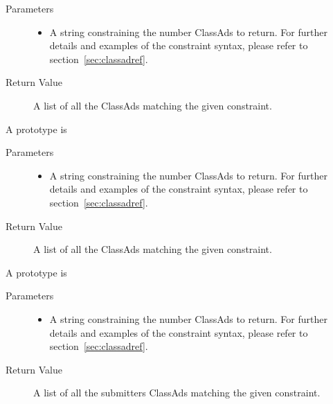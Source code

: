 \begin{description}

  \begin{description}
    \item[ Parameters]
    \begin{itemize}
      \item {} 
      A string constraining the number ClassAds to return. For further details 
      and examples of the constraint syntax, please refer to 
      section~\ref{sec:classadref}.
    \end{itemize}
    \item[ Return Value]
      A list of all the  ClassAds matching the given 
      constraint.
  \end{description}   

\item [\Code{queryMasterAds}]
  A prototype is 


  \begin{description}
    \item[ Parameters]
    \begin{itemize}
      \item {} 
      A string constraining the number ClassAds to return. For further details 
      and examples of the constraint syntax, please refer to 
      section~\ref{sec:classadref}.
    \end{itemize}
    \item[ Return Value]
      A list of all the  ClassAds matching the given 
      constraint.
  \end{description}

\item [\Code{querySubmittorAds}]
  A prototype is 


  \begin{description}
    \item[ Parameters]
    \begin{itemize}
      \item {} 
      A string constraining the number ClassAds to return. For further details 
      and examples of the constraint syntax, please refer to 
      section~\ref{sec:classadref}.
    \end{itemize}
    \item[ Return Value]
      A list of all the submitters ClassAds matching the given 
      constraint.
  \end{description}


\end{description}
